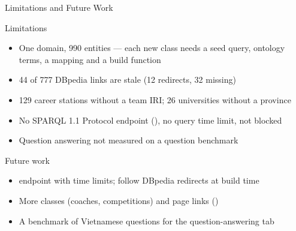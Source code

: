 \begin{frame}{Limitations and Future Work}
    \begin{block}{Limitations}
        \footnotesize
        \begin{itemize}
            \item One domain, 990 entities --- each new class needs a seed query,
                  ontology terms, a mapping and a build function
            \item 44 of 777 DBpedia links are stale (12 redirects, 32 missing)
            \item 129 career stations without a team IRI; 26 universities without a province
            \item No SPARQL 1.1 Protocol endpoint (), no query time limit,
                   not blocked
            \item Question answering not measured on a question benchmark
        \end{itemize}
    \end{block}
    \begin{block}{Future work}
        \footnotesize
        \begin{itemize}
            \item {} endpoint with time limits; follow DBpedia redirects at build time
            \item More classes (coaches, competitions) and page links ()
            \item A benchmark of Vietnamese questions for the question-answering tab
        \end{itemize}
    \end{block}
\end{frame}
